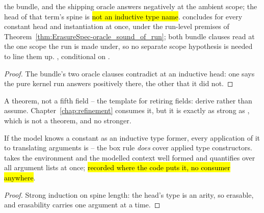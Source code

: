 \begin{theorem}
\label{thm:EraserAsks-oracle_informative}
\leanok
{} the  bundle, and the shipping oracle answers negatively at the
ambient scope;
 the head of that term's spine is \hl{not an inductive type name}.
 concludes for every constant head and instantiation at once, under the run-level
premises of Theorem~\ref{thm:ErasureSpec-oracle_sound_of_run}; both bundle clauses read at the
one scope the run is made under, so no separate scope hypothesis is needed to line them up.
 \stProved{}, conditional on \stAssumed{} .
\end{theorem}
\begin{proof}
\leanok
{}
 The bundle's two oracle clauses contradict at an inductive head: one says the pure
kernel run answers positively there, the other that it did not.
\end{proof}

\begin{remark}
 A theorem, not a fifth field -- the template for retiring fields: derive rather than
assume. Chapter~\ref{chap:refinement} consumes it, but it is exactly as strong as
, which is not a theorem, and no stronger.
\end{remark}

\begin{lemma}
\label{lem:erasable_indSpine}
\leanok
{} If the model knows a constant as an inductive type former, every application of it
to translating arguments is \Erasable{} -- the box rule \emph{does} cover applied type
constructors.
 takes the environment and the modelled context well formed and quantifies over all
argument lists at once; \hl{recorded where the code puts it, no consumer anywhere}.
\end{lemma}
\begin{proof}
\leanok
{}
 Strong induction on spine length: the head's type is an arity, so erasable, and
erasability carries one argument at a time.
\end{proof}

